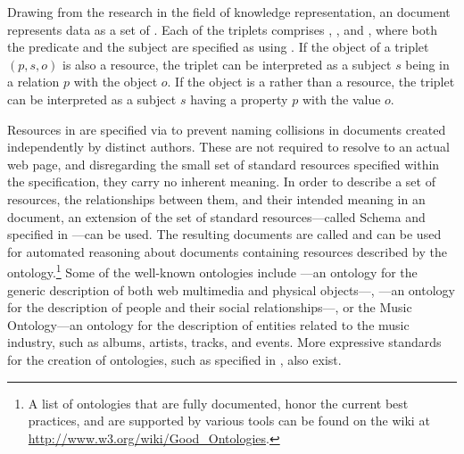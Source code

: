 \documentclass{book}
\begin{document}
Drawing from the research in the field of knowledge representation, an
 document represents data as a set of %
. Each of the triplets comprises , , and ,
where both the predicate and the subject are specified as 
 using . If the object of a triplet
$(p,s,o)$ is also a resource, the triplet can be interpreted as a subject $s$
being in a relation $p$ with the object $o$. If the object is a   rather than a resource, the triplet can be
interpreted as a subject $s$ having a property $p$ with the value $o$.

Resources in  are specified via  to prevent naming
collisions in  documents created independently by distinct authors.
These  are not required to resolve to an actual web page, and
disregarding the small set of standard resources specified within the
 specification, they carry no inherent meaning. In order to
describe a set of resources, the relationships between them, and their intended
meaning in an  document, an extension of the set of standard
resources---called  Schema and specified in
\cite{brickley04}---can be used. The resulting documents are called
  and can be used for automated
reasoning about  documents containing resources described by the
ontology.\footnote{
  A list of ontologies that are fully documented, honor the current best
  practices, and are supported by various tools can be found on the
   wiki at \url{http://www.w3.org/wiki/Good_Ontologies}.
} Some of the well-known ontologies include ---an ontology for the
generic description of both web multimedia and physical objects---,
---an ontology for the description of people and their social
relationships---, or the Music Ontology---an ontology for the description of
entities related to the music industry, such as albums, artists, tracks, and
events. More expressive standards for the creation of ontologies, such as
 specified in \cite{mcguinness04}, also exist.
\end{document}
